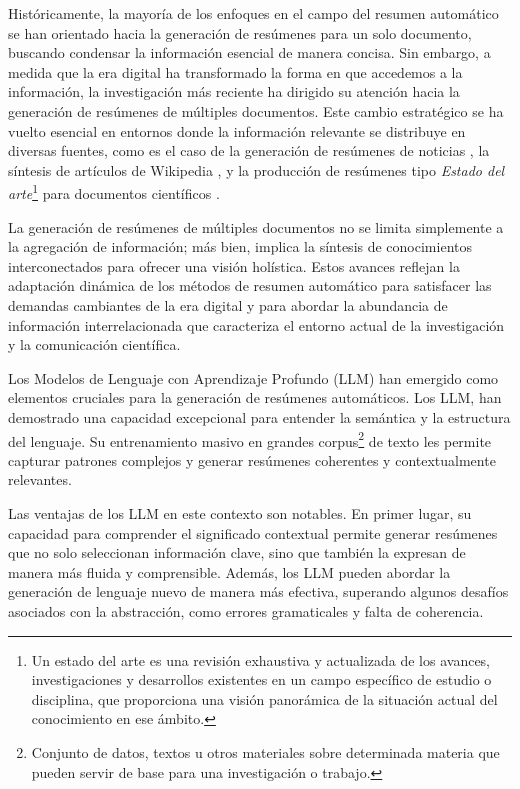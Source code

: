     Históricamente, la mayoría de los enfoques en el campo del resumen automático se han orientado hacia la generación de resúmenes para un solo documento, buscando condensar la información esencial de manera concisa. Sin embargo, a medida que la era digital ha transformado la forma en que accedemos a la información, la investigación más reciente ha dirigido su atención hacia la generación de resúmenes de múltiples documentos. Este cambio estratégico se ha vuelto esencial en entornos donde la información relevante se distribuye en diversas fuentes, como es el caso de la generación de resúmenes de noticias \cite{fabbri2019multi-news}, la síntesis de artículos de Wikipedia \cite{liu2018}, y la producción de resúmenes tipo \emph{Estado del arte}\footnote{Un estado del arte es una revisión exhaustiva y actualizada de los avances, investigaciones y desarrollos existentes en un campo específico de estudio o disciplina, que proporciona una visión panorámica de la situación actual del conocimiento en ese ámbito. } para documentos científicos \cite{lu2020multixscience}.

    La generación de resúmenes de múltiples documentos no se limita simplemente a la agregación de información; más bien, implica la síntesis de conocimientos interconectados para ofrecer una visión holística. 
    Estos avances reflejan la adaptación dinámica de los métodos de resumen automático para satisfacer las demandas cambiantes de la era digital y para abordar la abundancia de información interrelacionada que caracteriza el entorno actual de la investigación y la comunicación científica.

    Los Modelos de Lenguaje con Aprendizaje Profundo (LLM) han emergido como elementos cruciales para la generación de resúmenes automáticos. Los LLM, han demostrado una capacidad excepcional para entender la semántica y la estructura del lenguaje\cite{fewshot}. Su entrenamiento masivo en grandes corpus\footnote{Conjunto de datos, textos u otros materiales sobre determinada materia que pueden servir de base para una investigación o trabajo.} de texto les permite capturar patrones complejos y generar resúmenes coherentes y contextualmente relevantes.

    Las ventajas de los LLM en este contexto son notables. En primer lugar, su capacidad para comprender el significado contextual permite generar resúmenes que no solo seleccionan información clave, sino que también la expresan de manera más fluida y comprensible\cite{Radford2018ImprovingLU}. Además, los LLM pueden abordar la generación de lenguaje nuevo de manera más efectiva, superando algunos desafíos asociados con la abstracción, como errores gramaticales y falta de coherencia\cite{RoBERTa}.

